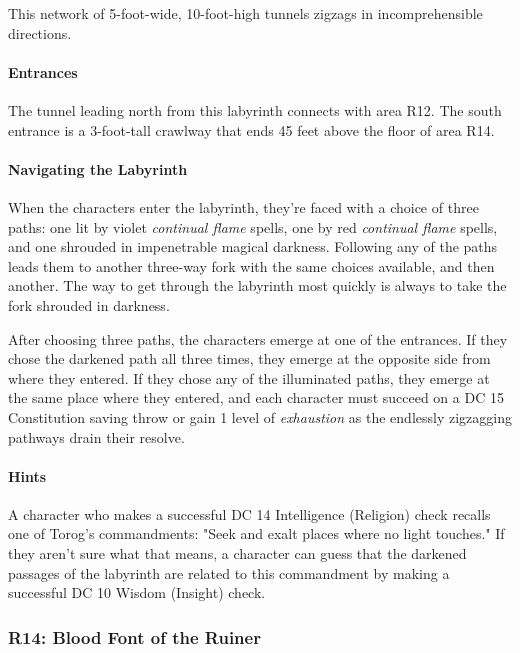 \documentclass[a4paper, 11pt, bg=full, twocolumn, nooutline]{dndbook}
\begin{document}
This network of 5-foot-wide, 10-foot-high tunnels zigzags in incomprehensible directions.

\paragraph{Entrances}

The tunnel leading north from this labyrinth connects with area R12. The south entrance is a 3-foot-tall crawlway that ends 45 feet above the floor of area R14.

\paragraph{Navigating the Labyrinth}

When the characters enter the labyrinth, they're faced with a choice of three paths: one lit by violet \textit{continual flame} spells, one by red \textit{continual flame} spells, and one shrouded in impenetrable magical darkness. Following any of the paths leads them to another three-way fork with the same choices available, and then another. The way to get through the labyrinth most quickly is always to take the fork shrouded in darkness.

After choosing three paths, the characters emerge at one of the entrances. If they chose the darkened path all three times, they emerge at the opposite side from where they entered. If they chose any of the illuminated paths, they emerge at the same place where they entered, and each character must succeed on a DC 15 Constitution saving throw or gain 1 level of \textit{exhaustion} as the endlessly zigzagging pathways drain their resolve.

\paragraph{Hints}

A character who makes a successful DC 14 Intelligence (Religion) check recalls one of Torog's commandments: "Seek and exalt places where no light touches." If they aren't sure what that means, a character can guess that the darkened passages of the labyrinth are related to this commandment by making a successful DC 10 Wisdom (Insight) check.

\subsubsection{R14: Blood Font of the Ruiner}
\end{document}
